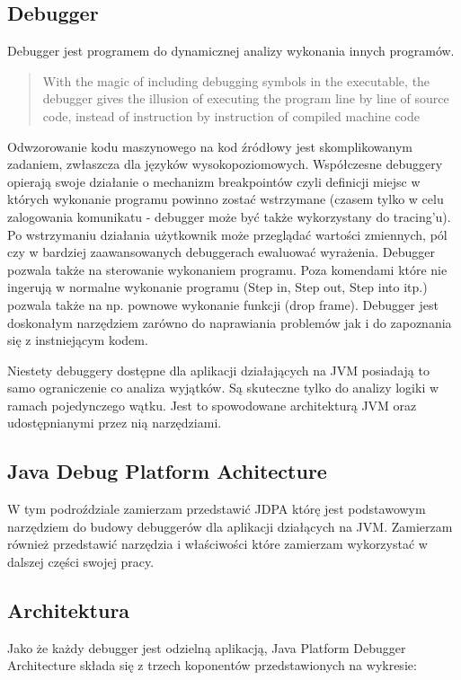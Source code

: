 \subsection{Debugger}
Debugger jest programem do dynamicznej analizy wykonania innych programów. 
\begin{quote}
    With the magic of including debugging symbols in the executable, the debugger gives the illusion of executing the program line by line of source code, instead of instruction by instruction of compiled machine code~\cite{artOfDebugging}
\end{quote}
Odwzorowanie kodu maszynowego na kod źródłowy jest skomplikowanym zadaniem, zwłaszcza dla języków wysokopoziomowych. Współczesne debuggery opierają swoje działanie o mechanizm breakpointów czyli definicji miejsc w których wykonanie programu powinno zostać wstrzymane (czasem tylko w celu zalogowania komunikatu - debugger może być także wykorzystany do tracing'u). Po wstrzymaniu działania użytkownik może przeglądać wartości zmiennych, pól czy w bardziej zaawansowanych debuggerach ewaluować wyrażenia.
Debugger pozwala także na sterowanie wykonaniem programu. Poza komendami które nie ingerują w normalne wykonanie programu (Step in, Step out, Step into itp.) pozwala także na np. pownowe wykonanie funkcji (drop frame). Debugger jest doskonałym narzędziem zarówno do naprawiania problemów jak i do zapoznania się z instniejącym kodem.



Niestety debuggery dostępne dla aplikacji działających na JVM posiadają to samo ograniczenie co   analiza wyjątków. Są skuteczne tylko do analizy logiki w ramach pojedynczego wątku. Jest to spowodowane architekturą JVM oraz udostępnianymi przez nią narzędziami.


\subsection{Java Debug Platform Achitecture}

W tym podroździale zamierzam przedstawić JDPA którę jest podstawowym narzędziem do budowy debuggerów dla aplikacji działących na JVM. Zamierzam również przedstawić narzędzia i właściwości które zamierzam wykorzystać w dalszej części swojej pracy.

\subsection{Architektura}

Jako że każdy debugger jest odzielną aplikacją, Java Platform Debugger Architecture składa się z trzech koponentów przedstawionych na wykresie:

